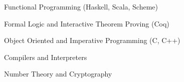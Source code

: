 \vspace{-0.5em}

\vspace{\topsep} %
\begin{tightitemize}
    \item Functional Programming (Haskell, Scala, Scheme) 
    \item Formal Logic and Interactive Theorem Proving (Coq)
    \item Object Oriented and Imperative Programming (C, C++)
    \item Compilers and Interpreters
    \item Number Theory and Cryptography
\end{tightitemize}
\smallskip












